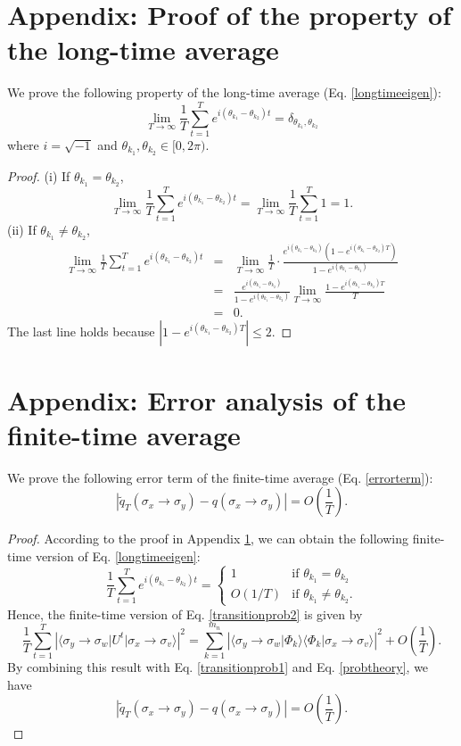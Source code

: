 \documentclass[10pt, letterpaper]{article}
\begin{document}
\medskip

\appendix
\section{Appendix: Proof of the property of the long-time average} \label{appendix1}
We prove the following property of the long-time average (Eq. \ref{longtimeeigen}):
$$\lim_{T\to\infty} \frac{1}{T} \sum_{t=1}^{T} e^{i(\theta_{k_1}-\theta_{k_2})t} = \delta_{\theta_{k_1}, \theta_{k_2}}$$
where $i=\sqrt{-1}$ and $\theta_{k_1}, \theta_{k_2}\in [0, 2\pi)$.

\begin{proof}
(i) If $\theta_{k_1}=\theta_{k_2}$,
$$\lim_{T\to\infty} \frac{1}{T} \sum_{t=1}^{T} e^{i(\theta_{k_1}-\theta_{k_2})t} = \lim_{T\to\infty} \frac{1}{T} \sum_{t=1}^{T} 1 = 1.$$
(ii) If $\theta_{k_1}\neq\theta_{k_2}$,
\begin{eqnarray*}
\lim_{T\to\infty} \frac{1}{T} \sum_{t=1}^{T} e^{i(\theta_{k_1}-\theta_{k_2})t} &=& \lim_{T\to\infty} \frac{1}{T} \cdot \frac{e^{i(\theta_{k_1}-\theta_{k_2})} \left(1-e^{i(\theta_{k_1}-\theta_{k_2})T} \right)}{1-e^{i(\theta_{k_1}-\theta_{k_2})}} \\
&=& \frac{e^{i(\theta_{k_1}-\theta_{k_2})}}{1-e^{i(\theta_{k_1}-\theta_{k_2})}} \lim_{T\to\infty} \frac{1-e^{i(\theta_{k_1}-\theta_{k_2})T}}{T} \\
&=& 0.
\end{eqnarray*}
The last line holds because $\left| 1-e^{i(\theta_{k_1}-\theta_{k_2})T}\right| \leq2$.
\end{proof}


\section{Appendix: Error analysis of the finite-time average} \label{appendix2}
We prove the following error term of the finite-time average (Eq. \ref{errorterm}):
$$\left| \tilde{q}_{T}(\sigma_x\to\sigma_y) - q(\sigma_x\to\sigma_y) \right| = O\left(\frac{1}{T}\right).$$

\begin{proof}
According to the proof in Appendix \ref{appendix1}, we can obtain the following finite-time version of Eq. \ref{longtimeeigen}:
$$\frac{1}{T} \sum_{t=1}^{T} e^{i(\theta_{k_1}-\theta_{k_2})t} =
\begin{cases}
1 & \text{if } \theta_{k_1}=\theta_{k_2} \\
O(1/T) & \text{if } \theta_{k_1}\neq\theta_{k_2}.
\end{cases}$$
Hence, the finite-time version of Eq. \ref{transitionprob2} is given by
$$\frac{1}{T} \sum_{t=1}^{T} \left| \langle\sigma_y\to\sigma_w \vert U^{t} \vert \sigma_x\to\sigma_v\rangle \right|^2
= \sum_{k=1}^{m_n} \left| \langle\sigma_y\to\sigma_w \vert \Phi_{k}\rangle \langle\Phi_{k} \vert \sigma_x\to\sigma_v\rangle \right|^2 + O\left(\frac{1}{T}\right).$$
By combining this result with Eq. \ref{transitionprob1} and Eq. \ref{probtheory}, we have
$$\left| \tilde{q}_{T}(\sigma_x\to\sigma_y) - q(\sigma_x\to\sigma_y) \right| = O\left(\frac{1}{T}\right).$$
\end{proof}


\medskip


\end{document}
